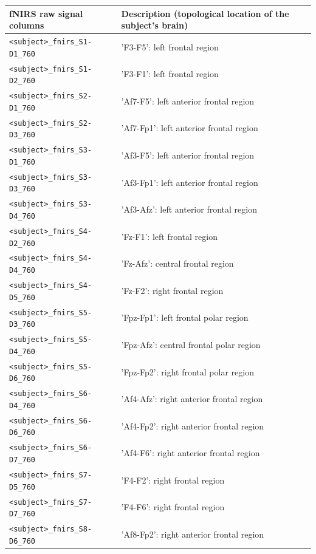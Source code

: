 \begin{table}
  \centering
  \begin{tabularx}{\textwidth}{lX}
  \toprule
  fNIRS raw signal columns & Description (topological location of the subject's brain) \\
  \midrule
  \texttt{<subject>\_fnirs\_S1-D1\_760} & 'F3-F5': left frontal region \\
  \texttt{<subject>\_fnirs\_S1-D2\_760} & 'F3-F1': left frontal region  \\
  \texttt{<subject>\_fnirs\_S2-D1\_760} & 'Af7-F5': left anterior frontal region  \\
  \texttt{<subject>\_fnirs\_S2-D3\_760} & 'Af7-Fp1': left anterior frontal region  \\
  \texttt{<subject>\_fnirs\_S3-D1\_760} & 'Af3-F5': left anterior frontal region  \\
  \texttt{<subject>\_fnirs\_S3-D3\_760} & 'Af3-Fp1': left anterior frontal region  \\
  \texttt{<subject>\_fnirs\_S3-D4\_760} & 'Af3-Afz': left anterior frontal region  \\
  \texttt{<subject>\_fnirs\_S4-D2\_760} & 'Fz-F1': left frontal region  \\
  \texttt{<subject>\_fnirs\_S4-D4\_760} & 'Fz-Afz': central frontal region  \\
  \texttt{<subject>\_fnirs\_S4-D5\_760} & 'Fz-F2': right frontal region  \\
  \texttt{<subject>\_fnirs\_S5-D3\_760} & 'Fpz-Fp1': left frontal polar region  \\
  \texttt{<subject>\_fnirs\_S5-D4\_760} & 'Fpz-Afz': central frontal polar region  \\
  \texttt{<subject>\_fnirs\_S5-D6\_760} & 'Fpz-Fp2': right frontal polar region  \\
  \texttt{<subject>\_fnirs\_S6-D4\_760} & 'Af4-Afz': right anterior frontal region  \\
  \texttt{<subject>\_fnirs\_S6-D6\_760} & 'Af4-Fp2': right anterior frontal region  \\
  \texttt{<subject>\_fnirs\_S6-D7\_760} & 'Af4-F6': right anterior frontal region  \\
  \texttt{<subject>\_fnirs\_S7-D5\_760} & 'F4-F2': right frontal region  \\
  \texttt{<subject>\_fnirs\_S7-D7\_760} & 'F4-F6': right frontal region  \\
  \texttt{<subject>\_fnirs\_S8-D6\_760} & 'Af8-Fp2': right anterior frontal region  \\

\end{tabularx}
\end{table}
